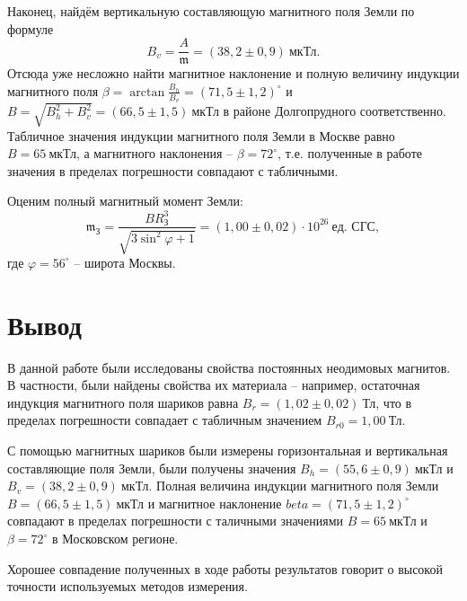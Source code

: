 \documentclass[a4paper,10pt]{article}
\begin{document}
Наконец, найдём вертикальную составляющую магнитного поля Земли по формуле\[B_v=\frac{A}{\mathfrak{m}}=\left(38,2\pm0,9\right)~\text{мкТл}.\]Отсюда уже несложно найти магнитное наклонение и полную величину индукции магнитного поля $\beta=\arctan{\frac{B_h}{B_v}}=\left(71,5\pm1,2\right)^{\circ}$ и $B=\sqrt{B_h^2+B_v^2}=\left(66,5\pm1,5\right)~\text{мкТл}$ в районе Долгопрудного соответственно. Табличное значения индукции магнитного поля Земли в Москве равно $B=65~\text{мкТл}$, а магнитного наклонения -- $\beta=72^{\circ}$, т.е. полученные в работе значения в пределах погрешности совпадают с табличными.

Оценим полный магнитный момент Земли:\[\mathfrak{m}_{\text{З}}=\frac{BR_{\text{З}}^3}{\sqrt{3\sin^2{\varphi}+1}}=\left(1,00\pm0,02\right)\cdot10^{26}~\text{ед. СГС},\]где $\varphi=56^{\circ}$ -- широта Москвы.

\section*{Вывод}

В данной работе были исследованы свойства постоянных неодимовых магнитов. В частности, были найдены свойства их материала -- например, остаточная индукция магнитного поля шариков равна $B_r=\left(1,02\pm0,02\right)~\text{Тл}$, что в пределах погрешности совпадает с табличным значением $B_{r0}=1,00~\text{Тл}$.

С помощью магнитных шариков были измерены горизонтальная и вертикальная составляющие поля Земли, были получены значения $B_h=\left(55,6\pm0,9\right)~\text{мкТл}$ и $B_v=\left(38,2\pm0,9\right)~\text{мкТл}$. Полная величина индукции магнитного поля Земли $B=\left(66,5\pm1,5\right)~\text{мкТл}$ и магнитное наклонение $beta=\left(71,5\pm1,2\right)^{\circ}$ совпадают в пределах погрешности с таличными значениями $B=65~\text{мкТл}$ и $\beta=72^{\circ}$ в Московском регионе.

Хорошее совпадение полученных в ходе работы результатов говорит о высокой точности используемых методов измерения.
\end{document}
